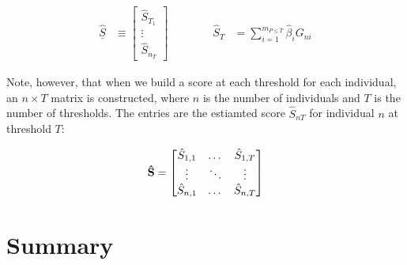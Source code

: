 $$ \begin{aligned} \underline{\hat{S}} &\equiv \begin{bmatrix} \hat{S}_{T_1} \\ \vdots \\ \hat{S}_{n_T} \end{bmatrix} &&&&& \hat{S}_T &= \sum^{m_{P \leq T}}_{i=1} \hat{\beta}_i G_{ni} \end{aligned}$$

Note, however, that when we build a score at each threshold for each individual, an $n \times T$ matrix is constructed, where $n$ is the number of individuals and $T$ is the number of thresholds. The entries are the estiamted score $\hat{S}_{nT}$ for individual $n$ at threshold $T$:

$$ \bold{\hat{S}} = \begin{bmatrix} \hat{S}_{1,1} & \dots & \hat{S}_{1, T} \\ \vdots & \ddots & \vdots \\ \hat{S}_{n, 1} & \dots & \hat{S}_{n, T} \end{bmatrix} $$

\section{Summary}